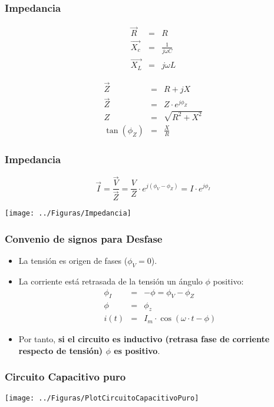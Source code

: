 \documentclass[serif, xcolor=dvipsnames]{beamer}
\begin{document}
\begin{frame}
  \frametitle{Impedancia}

\begin{eqnarray*}
  \vec{R} & = & R\\
  \vec{X_{c}} & = & \frac{1}{j\omega C}\\
  \vec{X_{L}} & = & j\omega L
\end{eqnarray*}


\begin{eqnarray*}
  \vec{Z} & = & R+jX\\
  \vec{Z} & = & Z\cdot e^{j\phi_{Z}}\\
  Z & = & \sqrt{R^{2}+X^{2}}\\
  \tan(\phi_{Z}) & = & \frac{X}{R}
\end{eqnarray*}



\end{frame}
\begin{frame}
  \frametitle{Impedancia}

\[
\vec{I}=\frac{\vec{V}}{\vec{Z}}=\frac{V}{Z}\cdot
e^{j(\phi_{V}-\phi_{Z})}=I\cdot e^{j\phi_{I}}
\]


\begin{center}
  \texttt{[image: ../Figuras/Impedancia]}
  \par\end{center}


\end{frame}
\begin{frame}
  \frametitle{Convenio de signos para Desfase}
  \begin{itemize}
  \item La tensión es origen de fases ($\phi_{V}=0$).
  \item La corriente está retrasada de la tensión un ángulo $\phi$
    positivo:
    \begin{eqnarray*}
      \phi_{I} & = & -\phi=\phi_{V}-\phi_{Z}\\
      \phi & = & \phi_{z}\\
      i(t) & = & I_{m}\cdot\cos(\omega\cdot t-\phi)
    \end{eqnarray*}

  \item Por tanto, \textbf{si el circuito es inductivo (retrasa fase
      de corriente respecto de tensión) $\phi$ es positivo}.
  \end{itemize}

\end{frame}
\begin{frame}[plain]
  \frametitle{Circuito Capacitivo puro}

  \begin{center}
    \texttt{[image: ../Figuras/PlotCircuitoCapacitivoPuro]}
    \par\end{center}


\end{frame}
\end{document}
